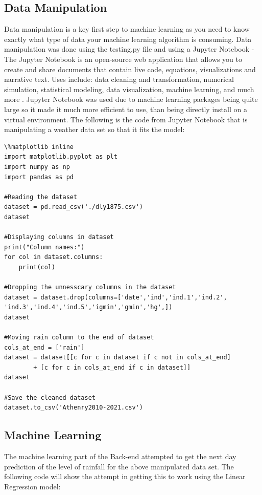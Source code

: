 \subsection{Data Manipulation}
Data manipulation is a key first step to machine learning as you need to know exactly what type of data your machine learning algorithm is consuming. Data manipulation was done using the testing.py file and using a Jupyter Notebook - The Jupyter Notebook is an open-source web application that allows you to create and share documents that contain live code, equations, visualizations and narrative text. Uses include: data cleaning and transformation, numerical simulation, statistical modeling, data visualization, machine learning, and much more \cite{JNotebook}. Jupyter Notebook was used due to machine learning packages being quite large so it made it much more efficient to use, than being directly install on a virtual environment. The following is the code from Jupyter Notebook that is manipulating a weather data set so that it fits the model:

\begin{verbatim}
\%matplotlib inline
import matplotlib.pyplot as plt
import numpy as np
import pandas as pd

#Reading the dataset 
dataset = pd.read_csv('./dly1875.csv')
dataset 

#Displaying columns in dataset
print("Column names:")
for col in dataset.columns:    
    print(col)
    
#Dropping the unnesscary columns in the dataset
dataset = dataset.drop(columns=['date','ind','ind.1','ind.2',
'ind.3','ind.4','ind.5','igmin','gmin','hg',])
dataset

#Moving rain column to the end of dataset
cols_at_end = ['rain']
dataset = dataset[[c for c in dataset if c not in cols_at_end] 
        + [c for c in cols_at_end if c in dataset]]
dataset

#Save the cleaned dataset 
dataset.to_csv('Athenry2010-2021.csv')

\end{verbatim}

\subsection{Machine Learning}
The machine learning part of the Back-end attempted to get the next day prediction of the level of rainfall for the above manipulated data set. The following code will show the attempt in getting this to work using the Linear Regression model:

